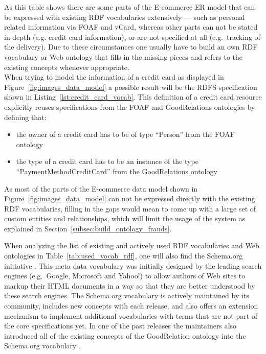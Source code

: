 As this table shows there are some parts of the \gls{E-commerce} \gls{ER} model that can be expressed with existing \gls{RDF} vocabularies extensively --- such as personal related information via \gls{FOAF} and \gls{vCard}, whereas other parts can not be stated in-depth (e.g. credit card information), or are not specified at all (e.g.\ tracking of the delivery). Due to these circumstances one usually have to build an own \gls{RDF} vocabulary or Web ontology that fills in the missing pieces and refers to the existing concepts whenever appropriate.\\

When trying to model the information of a credit card as displayed in Figure~\ref{fig:images_data_model} a possible result will be the \gls{RDFS} specification shown in Listing~\ref{lst:credit_card_vocab}. This definition of a credit card resource explicitly reuses specifications from the \gls{FOAF} and GoodRelations ontologies by defining that: \@

\begin{itemize}
 \item the owner of a credit card has to be of type ``Person'' from the \gls{FOAF} ontology
 \item the type of a credit card has to be an instance of the type ``PaymentMethodCreditCard'' from the GoodRelations ontology
\end{itemize}

As most of the parts of the \gls{E-commerce} data model shown in Figure~\ref{fig:images_data_model} can not be expressed directly with the existing \gls{RDF} vocabularies, filling in the gaps would mean to come up with a large set of custom entities and relationships, which will limit the usage of the system as explained in Section~\ref{subsec:build_ontology_frauds}.


When analyzing the list of existing and actively used \gls{RDF} vocabularies and Web ontologies in Table~\ref{tab:used_vocab_rdf}, one will also find the Schema.org initiative \citep{Schema.org}. This meta data vocabulary was initially designed by the leading search engines (e.g.\ Google, Microsoft and Yahoo!) to allow authors of Web sites to markup their \gls{HTML} documents in a way so that they are better understood by these search engines. The Schema.org vocabulary is actively maintained by its community, includes new concepts with each release, and also offers an extension mechanism to implement additional vocabularies with terms that are not part of the core specifications \citep{SchemaExtensions} yet. In one of the past releases the maintainers also introduced all of the existing concepts of the GoodRelation ontology into the Schema.org vocabulary \citep{SchemaGoodRelation}. \\

